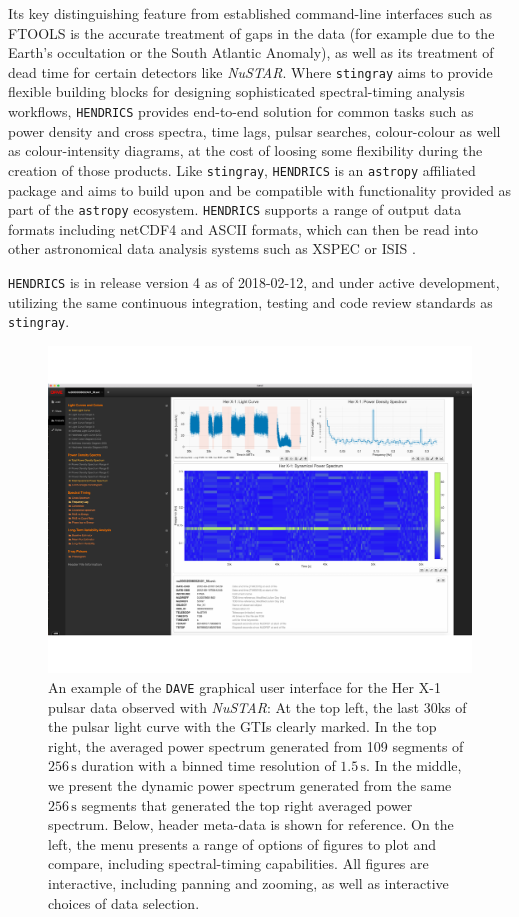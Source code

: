 \documentclass[twocolumn]{aastex62}
\newcommand{\project}[1]{\textsl{#1}\xspace}
\newcommand{\nustar}{\project{NuSTAR}\xspace}
\newcommand{\stingray}{\texttt{stingray}\xspace}
\newcommand{\astropy}{\texttt{astropy}\xspace}
\newcommand{\hendrics}{\texttt{HENDRICS}\xspace}
\newcommand{\dave}{\texttt{DAVE}\xspace}
\begin{document}
Its key distinguishing feature from established command-line interfaces such as FTOOLS is the accurate treatment of gaps in the data (for example due to the Earth's occultation or the South Atlantic Anomaly), as well as its treatment of dead time for certain detectors like \nustar. Where \stingray aims to provide flexible building blocks for designing sophisticated spectral-timing analysis workflows, \hendrics provides end-to-end solution for common tasks such as power density and cross spectra, time lags, pulsar searches, colour-colour as well as colour-intensity diagrams, at the cost of loosing some flexibility during the creation of those products. Like \stingray, \hendrics is an \astropy affiliated package and aims to build upon and be compatible with functionality provided as part of the \astropy ecosystem.
\hendrics supports a range of output data formats including netCDF4 and ASCII formats, which can then be read into other astronomical data analysis systems such as XSPEC \citep{arnaud1996} or ISIS  \citep{houck2000}.

\hendrics is in release version 4 as of 2018-02-12, and under active development, utilizing the same continuous integration, testing and code review standards as \stingray.


\begin{figure}[htbp]
\begin{center}
\includegraphics[width=\linewidth]{../figures/dave.pdf}
\caption{An example of the \dave graphical user interface for the Her X-1 pulsar data observed with \nustar: At the top left, the last 30ks of the pulsar light curve with the GTIs clearly marked. In the top right, the averaged power spectrum generated from 109 segments of $256\,\mathrm{s}$ duration with a binned time resolution of $1.5\,\mathrm{s}$. In the middle, we present the dynamic power spectrum generated from the same $256\,\mathrm{s}$ segments that generated the top right averaged power spectrum. Below, header meta-data is shown for reference. On the left, the menu presents a range of options of figures to plot and compare, including spectral-timing capabilities. All figures are interactive, including panning and zooming, as well as interactive choices of data selection.}
\label{fig:dave}
\end{center}
\end{figure}
\end{document}
